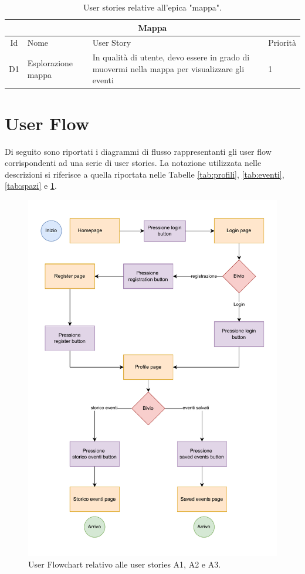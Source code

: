 \documentclass[9pt]{extarticle}
\begin{document}
\begin{table}[!htb]
	\centering
	\begin{tabular}{clp{7cm}l} %
		\toprule
		\multicolumn{4}{c}{\textbf{Mappa}}\\ \midrule
		Id & Nome & User Story & Priorità \\ \midrule
		D1  & Esplorazione mappa      & In qualità di utente, devo essere in grado di muovermi nella mappa per visualizzare gli eventi                           & 1 \\
		\bottomrule
	\end{tabular}
	\caption{User stories relative all'epica "mappa".}
	\label{tab:mappa}
\end{table}

\newpage
\section{User Flow}

Di seguito sono riportati i diagrammi di flusso rappresentanti gli user flow corrispondenti ad una serie di user stories. La notazione utilizzata nelle descrizioni si riferisce a quella riportata nelle Tabelle \ref{tab:profili}, \ref{tab:eventi}, \ref{tab:spazi} e \ref{tab:mappa}.

\begin{figure}[!htb]
	\centering
	\includegraphics[width=0.7\linewidth]{./images/A1-A2-A3.pdf}
	\caption{User Flowchart relativo alle user stories A1, A2 e A3.}
	\label{fig:A1-A2}
\end{figure}
\end{document}
